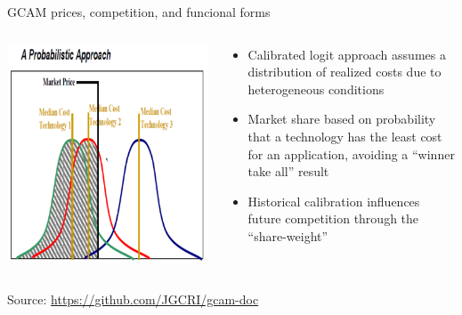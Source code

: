 \begin{frame}{GCAM prices, competition, and funcional forms}
    \begin{columns}[T] 
        \begin{column}{0.48\textwidth} 
            \centering
            \includegraphics[width=\textwidth]{extraFigs/GCAM_prob_approach.png}
        \end{column}
        \begin{column}{0.48\textwidth}
            \begin{itemize} \setlength\itemsep{5pt}
                \item Calibrated logit approach assumes a distribution of realized costs due to heterogeneous conditions
                \item Market share based on probability that a technology has the least cost for an application, avoiding a ``winner take all'' result
                \item Historical calibration influences future competition through the ``share-weight''
            \end{itemize}
        \end{column}
    \end{columns}
    \vfill\hfill \tiny{Source: \url{https://github.com/JGCRI/gcam-doc}}
\end{frame}

